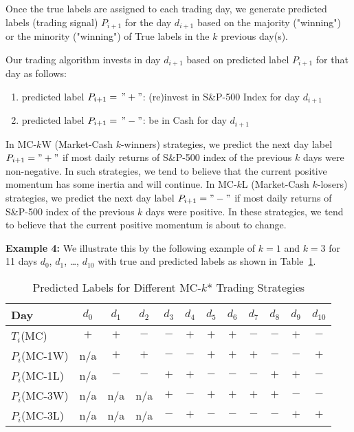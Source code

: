 \documentclass{article}
\begin{document}
Once the true labels are assigned to each trading day, we generate predicted labels (trading signal) $P_{i+1}$ for the day $d_{i+1}$ based on the majority ("winning") or the minority ("winning") of  True labels in the $k$ previous day(s).

Our trading algorithm invests in day $d_{i+1}$ based on predicted label $P_{i+1}$ for that day as follows:
\medskip
\begin{enumerate}[nosep]
    \item predicted label $P_{i+1}=\, "+"$: (re)invest in S{\&}P-500 Index for day $d_{i+1}$
    \item predicted label $P_{i+1}=\, "-"$: be in Cash for day $d_{i+1}$
\end{enumerate}

\medskip
In MC-$k$W (Market-Cash $k$-winners) strategies, we predict the next day label $P_{i+1}="+"$ if most daily returns of S{\&}P-500 index of the previous $k$ days were non-negative. In such strategies, we tend to believe that the current positive momentum has some inertia and will continue. In MC-$k$L (Market-Cash $k$-losers) strategies, we predict the next day label $P_{i+1}="-"$ if most daily returns of S{\&}P-500 index of the previous $k$ days were positive.  In these strategies, we tend to believe that the current positive momentum is about to change.

\medskip
\noindent
{\bf Example 4: } We illustrate this by the following example of $k=1$ and $k=3$ for 11 days $d_{0}$, $d_{1}$, \ldots, $d_{10}$ with
true and predicted labels as shown in Table~\ref{tab_signals_mc_11}.

\begin{table}[!h]
    \centering
    \caption{Predicted Labels for Different MC-$k$* Trading Strategies}
    \vspace{0.1in}
    \begin{tabular}{l | c c c c c  c c c c c c}
    \hline
        Day & $d_{0}$ & $d_{1}$ & $d_{2}$ & $d_{3}$ & $d_{4}$ & $d_{5}$ & $d_{6}$ & $d_{7}$ & $d_{8}$ & $d_{9}$ & $d_{10}$ \\ \hline
       $T_{i}$\;(MC)  & $+$ & $+$ & $-$ & $-$ & $+$ & $+$ & $+$ & $-$ & $-$ & $+$ & $-$\\

        $P_{i}$\;(MC-1W) & n/a & $+$ & $+$ & $-$ & $-$ & $+$ & $+$ & $+$ & $-$ & $-$ & $+$\\
        $P_{i}$\;(MC-1L)     & n/a & $-$ & $-$ & $+$ & $+$ & $-$ & $-$ & $-$ & $+$ & $+$ & $-$\\
        $P_{i}$\;(MC-3W)  & n/a & n/a & n/a & $+$ & $-$ & $+$ & $+$ & $+$ & $+$ & $-$ & $-$\\
        $P_{i}$\;(MC-3L)  & n/a & n/a & n/a & $-$ & $+$ & $-$ & $-$ & $-$ & $-$ & $+$ & $+$\\
        \hline
\end{tabular}
\label{tab_signals_mc_11}
\end{table}
\end{document}
